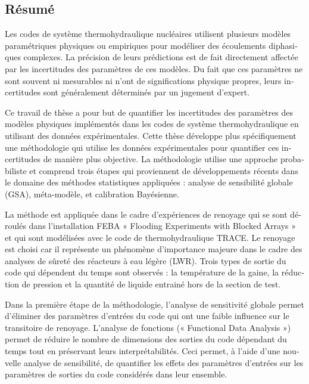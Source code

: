 \begin{otherlanguage}{ngerman}
\chapter*{R\'esum\'e}

Les codes de système thermohydraulique nucléaires utilisent plusieurs modèles paramétriques physiques ou empiriques pour modéliser des écoulements diphasiques complexes.
La précision de leurs prédictions est de fait directement affectée par les incertitudes des paramètres de ces modèles.
Du fait que ces paramètres ne sont souvent ni mesurables ni n’ont de significations physique propres, leurs incertitudes sont généralement déterminés par un jugement d’expert.

Ce travail de thèse a pour but de quantifier les incertitudes des paramètres des modèles physiques implémentés dans les codes de système thermohydraulique en utilisant des données expérimentales. Cette thèse développe plus spécifiquement une méthodologie qui utilise les données expérimentales pour quantifier ces incertitudes de manière plus objective. La méthodologie utilise une approche probabiliste et comprend trois étapes qui proviennent de développements récents dans le domaine des méthodes statistiques appliquées : analyse de sensibilité globale (GSA), méta-modèle, et calibration Bayésienne. 

La méthode est appliquée dans le cadre d’expériences de renoyage qui se sont déroulés dans l’installation FEBA « Flooding Experiments with Blocked Arrays » et qui sont modélisées avec le code de thermohydraulique TRACE. Le renoyage est choisi car il représente un phénomène d’importance majeure dans le cadre des analyses de sûreté des réacteurs à eau légère (LWR). Trois types de sortie du code qui dépendent du temps sont observés : la température de la gaine, la réduction de pression et la quantité de liquide entrainé hors de la section de test.

Dans la première étape de la méthodologie, l’analyse de sensitivité globale permet d’éliminer des paramètres d’entrées du code qui ont une faible influence sur le transitoire de renoyage. L’analyse de fonctions (« Functional Data Analysis ») permet de réduire le nombre de dimensions des sorties du code dépendant du temps tout en préservant leurs interprétabilités. Ceci permet, à l’aide d’une nouvelle analyse de sensibilité, de quantifier les effets des paramètres d’entrées  sur les paramètres de sorties du code considérés dans leur ensemble.


\end{otherlanguage}

